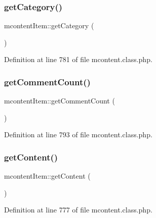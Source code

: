 \subsubsection{\texorpdfstring{get\+Category()}{getCategory()}}
{\footnotesize\ttfamily mcontent\+Item\+::get\+Category (\begin{DoxyParamCaption}{ }\end{DoxyParamCaption})}



Definition at line 781 of file mcontent.\+class.\+php.

\hypertarget{classmcontentItem_ac60221ec5be0a8158c5248c09efd8fb1}{}\label{classmcontentItem_ac60221ec5be0a8158c5248c09efd8fb1} 
\subsubsection{\texorpdfstring{get\+Comment\+Count()}{getCommentCount()}}
{\footnotesize\ttfamily mcontent\+Item\+::get\+Comment\+Count (\begin{DoxyParamCaption}{ }\end{DoxyParamCaption})}



Definition at line 793 of file mcontent.\+class.\+php.

\hypertarget{classmcontentItem_a19b333e6ff14db6f7f77c3f94471bdff}{}\label{classmcontentItem_a19b333e6ff14db6f7f77c3f94471bdff} 
\subsubsection{\texorpdfstring{get\+Content()}{getContent()}}
{\footnotesize\ttfamily mcontent\+Item\+::get\+Content (\begin{DoxyParamCaption}{ }\end{DoxyParamCaption})}



Definition at line 777 of file mcontent.\+class.\+php.

\hypertarget{classmcontentItem_a60fe1f5cbd47314c2910a8782a3252a9}{}\label{classmcontentItem_a60fe1f5cbd47314c2910a8782a3252a9} 
